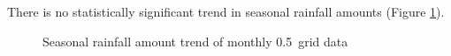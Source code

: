 There is no statistically significant trend in seasonal rainfall amounts
(Figure \ref{fig:grid_DJF_trend}).

\begin{figure}[htbp]
  \centering

  \caption{Seasonal rainfall amount trend of monthly 0.5\textdegree\ grid
data}

  \label{fig:grid_DJF_trend}
\end{figure}

